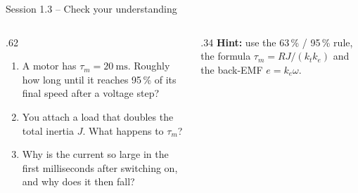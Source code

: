 \documentclass[aspectratio=169,10pt]{beamer}
\begin{document}
\begin{frame}{Session 1.3 -- Check your understanding}
\begin{columns}[T]
\begin{column}{.62\textwidth}
\begin{keybox}
\begin{enumerate}\setlength\itemsep{6pt}
\item A motor has $\tau_m=\SI{20}{\milli\second}$. Roughly how long until it reaches 95\,\% of its final speed after a voltage step?
\item You attach a load that doubles the total inertia $J$. What happens to $\tau_m$?
\item Why is the current so large in the first milliseconds after switching on, and why does it then fall?
\end{enumerate}
\end{keybox}
\end{column}
\begin{column}{.34\textwidth}
\small
\textbf{Hint:} use the 63\,\% / 95\,\% rule, the formula $\tau_m=RJ/(k_tk_e)$ and the back-EMF $e=k_e\omega$.
\end{column}
\end{columns}
\end{frame}
\end{document}
